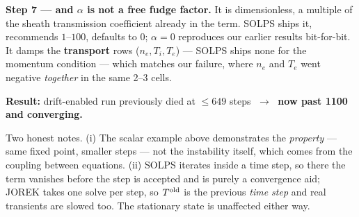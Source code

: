 \documentclass[11pt,a4paper]{article}
\newcommand{\Told}{T^{\rm old}}
\begin{document}
\vspace{5pt}
\textbf{Step 7 --- and $\alpha$ is not a free fudge factor.} It is dimensionless, a multiple of the
sheath transmission coefficient already in the term. SOLPS ships it, recommends $1$--$100$,
defaults to $0$; $\alpha=0$ reproduces our earlier results bit-for-bit. It damps the
\textbf{transport} rows ($n_e,T_i,T_e$) --- SOLPS ships none for the momentum condition --- which
matches our failure, where $n_e$ and $T_e$ went negative \emph{together} in the same 2--3 cells.

\vspace{4pt}
\textbf{Result:} drift-enabled run previously died at $\le649$ steps
$\;\rightarrow\;$ \textbf{now past 1100 and converging.}

\vspace{3pt}
{\footnotesize\textcolor{black!55}{Two honest notes. (i) The scalar example above demonstrates the
\emph{property} --- same fixed point, smaller steps --- not the instability itself, which comes
from the coupling between equations. (ii) SOLPS iterates inside a time step, so there the term
vanishes before the step is accepted and is purely a convergence aid; JOREK takes one solve per
step, so $\Told$ is the previous \emph{time step} and real transients are slowed too. The
stationary state is unaffected either way.}}
\end{document}
